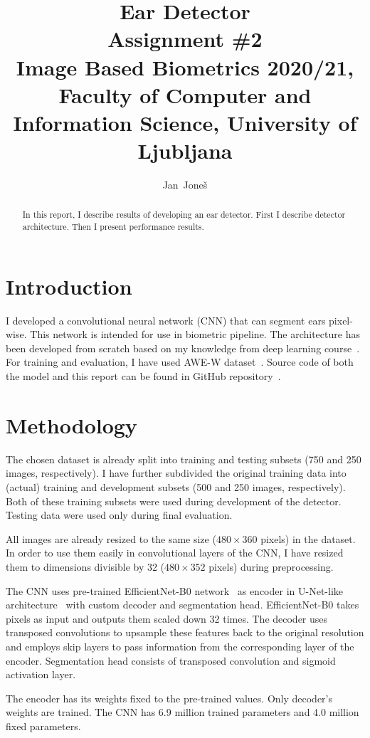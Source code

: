 \documentclass[9pt]{IEEEtran}
\title{\vspace{0ex} %
Ear Detector
\\ \large{Assignment \#2}\\ \normalsize{Image Based Biometrics 2020/21, Faculty of Computer and Information Science, University of Ljubljana}}
\author{ %
Jan~Joneš
\vspace{-4.0ex}
}
\begin{document}
\maketitle

\begin{abstract}
In this report, I describe results of developing an ear detector.
First I describe detector architecture.
Then I present performance results.
\end{abstract}

\section{Introduction}
I developed a convolutional neural network (CNN) that can segment ears pixel-wise.
This network is intended for use in biometric pipeline.
The architecture has been developed from scratch based on my knowledge from deep learning course~\cite{npfl114}.
For training and evaluation, I have used AWE-W dataset~\cite{awe}.
Source code of both the model and this report can be found in GitHub repository~\cite{repo}.

\section{Methodology}
The chosen dataset is already split into training and testing subsets (750 and 250 images, respectively).
I have further subdivided the original training data into (actual) training and development subsets (500 and 250 images, respectively).
Both of these training subsets were used during development of the detector.
Testing data were used only during final evaluation.

All images are already resized to the same size ($480 \times 360$ pixels) in the dataset.
In order to use them easily in convolutional layers of the CNN, I have resized them to dimensions divisible by 32 ($480 \times 352$ pixels) during preprocessing.

The CNN uses pre-trained EfficientNet-B0 network~\cite{efficientNet} as encoder in U-Net-like architecture~\cite{unet} with custom decoder and segmentation head.
EfficientNet-B0 takes pixels as input and outputs them scaled down 32 times. The decoder uses transposed convolutions to upsample these features back to the original resolution and employs skip layers to pass information from the corresponding layer of the encoder. Segmentation head consists of transposed convolution and sigmoid activation layer.

The encoder has its weights fixed to the pre-trained values. Only decoder's weights are trained. The CNN has 6.9 million trained parameters and 4.0 million fixed parameters.
\end{document}
